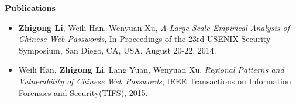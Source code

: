 \documentclass[letterpaper,10pt]{article}
\newcommand{\resheading}[1]{{\large \colorbox{mygrey}{\begin{minipage}{\textwidth}{\textbf{#1 \vphantom{p\^{E}}}}\end{minipage}}}}
\begin{document}








\resheading{Publications}
\begin{itemize}
 \item 
 \textbf{Zhigong Li}, Weili Han, Wenyuan Xu, \emph{A Large-Scale Empirical Analysis of Chinese Web Passwords}, In Proceedings of the 23rd {USENIX} Security Symposium, San Diego, CA, USA, August 20-22, 2014.
 \item Weili Han, \textbf{Zhigong Li}, Lang Yuan, Wenyuan Xu, \emph{Regional Patterns and Vulnerability of Chinese Web Passwords}, IEEE Transactions on Information Forensics and Security(TIFS), 2015.
\end{itemize}
\end{document}
